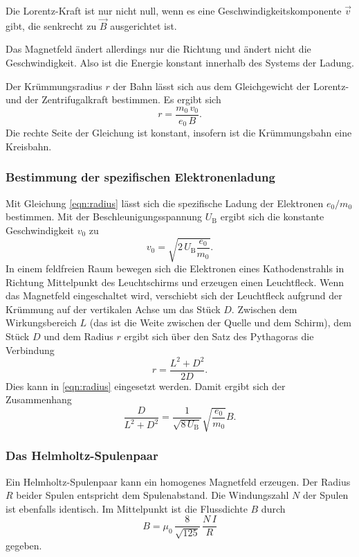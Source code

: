 \noindent Die Lorentz-Kraft ist nur nicht null, wenn es eine 
Geschwindigkeitskomponente $\vec{v}$ gibt, die senkrecht zu 
$\vec{B}$ ausgerichtet ist. 

\noindent Das  Magnetfeld ändert allerdings nur die Richtung und ändert 
nicht die Geschwindigkeit. Also ist die Energie konstant 
innerhalb des Systems der Ladung.

\noindent Der Krümmungsradius $r$ der Bahn lässt sich aus dem Gleichgewicht der 
Lorentz- und der Zentrifugalkraft bestimmen. Es ergibt sich 
\begin{equation}
    r= \frac{m_\text{0} \, v_\text{0}}{e_\text{0} \, B}.
    \label{eqn:radius}
\end{equation}
Die rechte Seite der Gleichung ist konstant, insofern ist die 
Krümmungsbahn eine Kreisbahn. 

\subsubsection{Bestimmung der spezifischen Elektronenladung}
Mit Gleichung \ref{eqn:radius} lässt sich die spezifische 
Ladung der Elektronen $e_\text{0}/m_\text{0}$ bestimmen. 
Mit der Beschleunigungsspannung $U_\text{B}$ ergibt sich die 
konstante Geschwindigkeit $v_\text{0}$ zu 
\begin{equation}
    v_\text{0}= \sqrt{2 \, U_\text{B} \frac{e_\text{0}}{m_\text{0}}}.
    \label{eqn:v0}
\end{equation}
In einem feldfreien Raum bewegen sich die Elektronen eines 
Kathodenstrahls in Richtung Mittelpunkt des Leuchtschirms und 
erzeugen einen Leuchtfleck. 
Wenn das Magnetfeld eingeschaltet wird, verschiebt sich 
der Leuchtfleck aufgrund der Krümmung auf der vertikalen Achse 
um das Stück $D$. Zwischen dem Wirkungsbereich $L$ (das ist die Weite 
zwischen der Quelle und dem Schirm), dem Stück $D$ und dem 
Radius $r$ ergibt sich über den Satz des Pythagoras die 
Verbindung
\begin{equation}
    r = \frac{L^2 + D^2}{2D}.
    \label{eqn:radius2}
\end{equation}
Dies kann in \ref{eqn:radius} eingesetzt werden.
Damit ergibt sich der Zusammenhang
\begin{equation}
    \frac{D}{L^2 + D^2}= \frac{1}{\sqrt{8 \, U_\text{B}}}\sqrt{\frac{e_\text{0}}{m_\text{0}}} B.
    \label{eqn:Ende}
\end{equation}

\subsubsection{Das Helmholtz-Spulenpaar}
Ein Helmholtz-Spulenpaar kann ein homogenes Magnetfeld erzeugen.
Der Radius $R$ beider Spulen entspricht dem Spulenabstand.
Die Windungszahl $N$ der Spulen ist ebenfalls identisch.
Im Mittelpunkt ist die Flussdichte $B$ durch
\begin{equation}
    B = \mu_0 \, \frac{8}{\sqrt{125}} \, \frac{N \, I}{R}
    \label{eqn:helmholtz}
\end{equation}
gegeben.